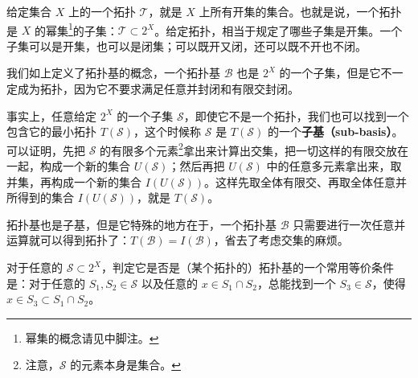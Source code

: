 给定集合 $X$ 上的一个拓扑 $\mathcal{T}$，就是 $X$ 上所有开集的集合。也就是说，一个拓扑是 $X$ 的幂集\footnote{幂集的概念请见中脚注。}的子集：$\mathcal{T}\subset 2^X$。给定拓扑，相当于规定了哪些子集是开集。一个子集可以是开集，也可以是闭集；可以既开又闭，还可以既不开也不闭。

我们如上定义了拓扑基的概念，一个拓扑基 $\mathcal{B}$ 也是 $2^X$ 的一个子集，但是它不一定成为拓扑，因为它不要求满足任意并封闭和有限交封闭。

事实上，任意给定 $2^X$ 的一个子集 $\mathcal{S}$，即使它不是一个拓扑，我们也可以找到一个包含它的最小拓扑 $T(\mathcal{S})$，这个时候称 $\mathcal{S}$ 是 $T(\mathcal{S})$ 的一个\textbf{子基（sub-basis）}。可以证明，先把 $\mathcal{S}$ 的有限多个元素\footnote{注意，$\mathcal{S}$ 的元素本身是集合。}拿出来计算出交集，把一切这样的有限交放在一起，构成一个新的集合 $U(\mathcal{S})$；然后再把 $U(\mathcal{S})$ 中的任意多元素拿出来，取并集，再构成一个新的集合 $I(U(\mathcal{S}))$。这样先取全体有限交、再取全体任意并所得到的集合 $I(U(\mathcal{S}))$，就是 $T(\mathcal{S})$。

拓扑基也是子基，但是它特殊的地方在于，一个拓扑基 $\mathcal{B}$ 只需要进行一次任意并运算就可以得到拓扑了：$T(\mathcal{B})=I(\mathcal{B})$，省去了考虑交集的麻烦。

对于任意的 $\mathcal{S}\subset2^X$，判定它是否是（某个拓扑的）拓扑基的一个常用等价条件是：对于任意的 $S_1, S_2\in \mathcal{S}$ 以及任意的 $x\in S_1\cap S_2$，总能找到一个 $S_3\in\mathcal{S}$，使得 $x\in S_3\subset S_1\cap S_2$。
